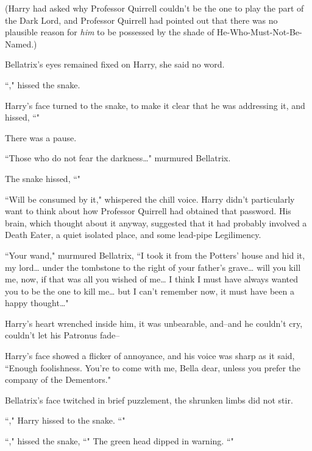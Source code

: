 (Harry had asked why Professor Quirrell couldn't be the one to play the part of the Dark Lord, and Professor Quirrell had pointed out that there was no plausible reason for \emph{him} to be possessed by the shade of He-Who-Must-Not-Be-Named.)

Bellatrix's eyes remained fixed on Harry, she said no word.

``," hissed the snake.

Harry's face turned to the snake, to make it clear that he was addressing it, and hissed, ``"

There was a pause.

``Those who do not fear the darkness{\ldots}" murmured Bellatrix.

The snake hissed, ``"

``Will be consumed by it," whispered the chill voice. Harry didn't particularly want to think about how Professor Quirrell had obtained that password. His brain, which thought about it anyway, suggested that it had probably involved a Death Eater, a quiet isolated place, and some lead-pipe Legilimency.

``Your wand," murmured Bellatrix, ``I took it from the Potters' house and hid it, my lord{\ldots} under the tombstone to the right of your father's grave{\ldots} will you kill me, now, if that was all you wished of me{\ldots} I think I must have always wanted you to be the one to kill me{\ldots} but I can't remember now, it must have been a happy thought{\ldots}"

Harry's heart wrenched inside him, it was unbearable, and\---and he couldn't cry, couldn't let his Patronus fade\---

Harry's face showed a flicker of annoyance, and his voice was sharp as it said, ``Enough foolishness. You're to come with me, Bella dear, unless you prefer the company of the Dementors."

Bellatrix's face twitched in brief puzzlement, the shrunken limbs did not stir.

``," Harry hissed to the snake. ``"

``," hissed the snake, ``" The green head dipped in warning. ``"


